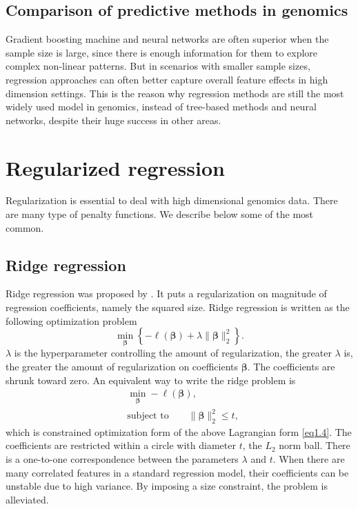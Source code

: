 \subsection{Comparison of predictive methods in genomics}
Gradient boosting machine and neural networks are often superior when the sample size is large, since there is enough information for them to explore complex non-linear patterns. But in scenarios with smaller sample sizes, regression approaches can often better capture overall feature effects in high dimension settings. This is the reason why regression methods are still the most widely used model in genomics, instead of tree-based methods and neural networks, despite their huge success in other areas.


\section{Regularized regression} \label{sec:pen_reg}
Regularization is essential to deal with high dimensional genomics data. There are many type of penalty functions. We describe below some of the most common.

\subsection{Ridge regression}
Ridge regression was proposed by \cite{hoerl1970ridge}. It puts a regularization on magnitude of regression coefficients, namely the squared size. Ridge regression is written as the following optimization problem 
\begin{equation}
    \min_{\bm{\beta}} \left\{ -\ell(\bm{\beta})+\lambda\|\bm{\beta}\|_2^2  \right\}. \label{eq1.4}
\end{equation}
$\lambda$ is the hyperparameter controlling the amount of regularization, the greater $\lambda$ is, the greater the amount of regularization on coefficients $\bm{\beta}$. The coefficients are shrunk toward zero. An equivalent way to write the ridge problem is 
\begin{equation}
    \begin{aligned}
    &\min_{\bm{\beta}} -\ell(\bm{\beta}), \\
    &\text{subject to} \qquad \|\bm{\beta}\|_2^2 \leq t, \label{eq1.5}
    \end{aligned}
\end{equation}
which is constrained optimization form of the above Lagrangian form \eqref{eq1.4}. The coefficients are restricted within a circle with diameter $t$, the $L_2$ norm ball. There is a one-to-one correspondence between the parameters $\lambda$ and $t$. When there are many correlated features in a standard regression model, their coefficients can be unstable due to high variance. By imposing a size constraint, the problem is alleviated. 

